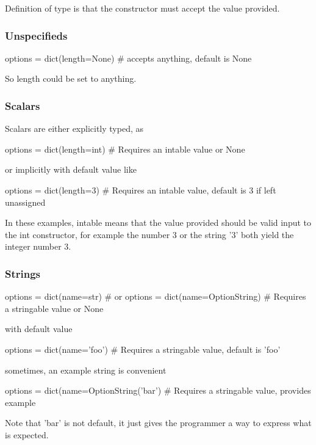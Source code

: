 Definition of type is that the constructor must accept the value
provided.


\subsubsection{Unspecifieds}
\begin{python}
  options = dict(length=None)
  # accepts anything, default is None
\end{python}
So length could be set to anything.



\subsubsection*{Scalars}
Scalars are either explicitly typed, as

\begin{python}
  options = dict(length=int)
  # Requires an intable value or None
\end{python}
or implicitly with default value like

\begin{python}
  options = dict(length=3)
  # Requires an intable value, default is 3 if left unassigned
\end{python}
In these examples, intable means that the value provided should be
valid input to the int constructor, for example the number 3 or the
string '3' both yield the integer number 3.



\subsubsection*{Strings}
\begin{python}
  options = dict(name=str)           # or
  options = dict(name=OptionString)
  # Requires a stringable value or None
\end{python}
with default value

\begin{python}
  options = dict(name='foo')
  # Requires a stringable value, default is 'foo'
\end{python}
sometimes, an example string is convenient

\begin{python}
  options = dict(name=OptionString('bar')
  # Requires a stringable value, provides example
\end{python}
Note that 'bar' is not default, it just gives the programmer a way to
express what is expected.



